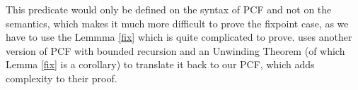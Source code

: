 This predicate would only be defined on the syntax of PCF and not on the semantics, which makes it much more difficult to prove the fixpoint case, as we have to use the Lemmma \ref{fix} which is quite complicated to prove. \citep{Gunter92} uses another version of PCF with bounded recursion and an Unwinding Theorem (of which Lemma \ref{fix} is a corollary) to translate it back to our PCF, which adds complexity to their proof.  
%
%
%
%
%
%
%


